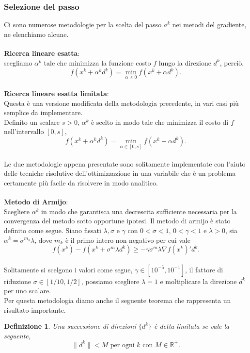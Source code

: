 \documentclass[a4paper, 12pt]{article}
\newtheorem{definition}{Definizione}
\begin{document}
\subsubsection{Selezione del passo} \label{stepsel}
Ci sono numerose metodologie per la scelta del passo $a^k$ nei metodi del gradiente, ne elenchiamo alcune.\\\\
\textbf{Ricerca lineare esatta}:\\
scegliamo $\alpha^k$ tale che minimizza la funzione costo $f$ lungo la direzione $d^k$, perciò,\\
\[f(x^k + \alpha^k d^k) = \min_{\alpha \geq 0} f(x^k + \alpha d^k).\]\\
\textbf{Ricerca lineare esatta limitata}:\\
Questa è una versione modificata della metodologia precedente, in vari casi più semplice da implementare.\\
Definito un scalare $s > 0$, $\alpha^k$ è scelto in modo tale che minimizza il costo di $f$ nell'intervallo $[0, s]$,\\
\[f(x^k + \alpha^k d^k) = \min_{\alpha \in [0, s]} f(x^k + \alpha d^k).\]\\
Le due metodologie appena presentate sono solitamente implementate con l'aiuto delle tecniche risolutive dell'ottimizzazione in una variabile che è un problema certamente più facile da risolvere in modo analitico.\\\\
\textbf{Metodo di Armijo}:\\
Scegliere $\alpha^k$ in modo che garantisca una decrescita sufficiente necessaria per la convergenza del metodo sotto opportune ipotesi. Il metodo di armijo è stato definito come segue. Siano fissati $\lambda, \sigma$ e $\gamma$ con $0 < \sigma < 1$, $0 < \gamma < 1$ e $\lambda > 0$, sia $\alpha^k = \sigma^{m_k} \lambda$, dove $m_k$ è il primo intero non negativo per cui vale\\
\[f(x^k) - f(x^k + \sigma^m \lambda d^k) \geq -\gamma \sigma^m \lambda \nabla f(x^k)'d^k.\]\\
Solitamente si scelgono i valori come segue, $\gamma \in [10^{-5}, 10^{-1}]$, il fattore di riduzione $\sigma \in [1/10, 1/2]$, possiamo scegliere $\lambda = 1$ e moltiplicare la direzione $d^k$ per uno scalare.\\
Per questa metodologia diamo anche il seguente teorema che rappresenta un risultato importante.
\begin{definition}
Una successione di direzioni $\{d^k\}$ è detta limitata se vale la seguente,\\ \[\| d^k \| < M \mbox{ per ogni } k \mbox{ con } M \in \mathbb{R}^+.\]
\end{definition}
\end{document}
